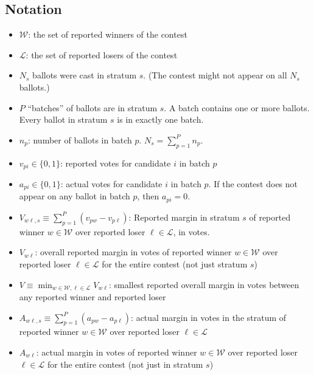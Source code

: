 \documentclass[runningheads]{llncs}
\begin{document}
\subsection{Notation}
\begin{itemize}
    \item  $\mathcal{W}$: the set of reported winners of the contest
    \item  $\mathcal{L}$: the set of reported losers of the contest
    \item  $N_s$ ballots were cast in stratum $s$. (The contest might not appear on all $N_s$ ballots.)
    \item  $P$ ``batches'' of ballots are in stratum $s$. A batch contains one or more ballots. Every ballot in stratum $s$ is in exactly one batch.
    \item  $n_p$: number of ballots in batch $p$. $N_s = \sum_{p=1}^P n_p$.
    \item  $v_{pi} \in \{0, 1\}$: reported votes for candidate $i$ in batch $p$
    \item  $a_{pi} \in \{0, 1\}$: actual votes for candidate $i$ in batch $p$. 
                  If the contest does not appear on any ballot in batch $p$, then $a_{pi} = 0$.
                  
    \item  $V_{w\ell,s} \equiv \sum_{p=1}^P (v_{pw} - v_{p\ell})$: 
Reported margin in stratum $s$ of reported winner $w \in \mathcal{W}$ over reported loser 
$\ell \in \mathcal{L}$, in votes.

    \item  $V_{w\ell}$: 
overall reported margin in votes of reported winner $w \in \mathcal{W}$ over reported loser 
$\ell \in \mathcal{L}$ for the entire contest (not just stratum $s$)

    \item  $V \equiv \min_{w \in \mathcal{W}, \ell \in \mathcal{L}} V_{w \ell}$: 
smallest reported overall margin in votes between any reported winner and reported loser

    \item  $A_{w\ell,s} \equiv \sum_{p=1}^P (a_{pw} - a_{p\ell})$: 
actual margin in votes in the stratum of reported winner $w \in \mathcal{W}$ over reported loser 
$\ell \in \mathcal{L}$

    \item  $A_{w\ell}$: 
actual margin in votes of reported winner $w \in \mathcal{W}$ over reported loser 
$\ell \in \mathcal{L}$ for the entire contest (not just in stratum $s$)

\end{itemize}
\end{document}
